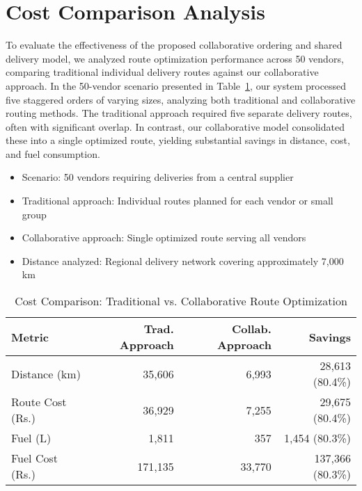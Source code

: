 \section{Cost Comparison Analysis}
To evaluate the effectiveness of the proposed collaborative ordering and shared delivery model, we analyzed route optimization performance across 50 vendors, comparing traditional individual delivery routes against our collaborative approach. In the 50-vendor scenario presented in Table~\ref{tab:cost-comparison}, our system processed five staggered orders of varying sizes, analyzing both traditional and collaborative routing methods. The traditional approach required five separate delivery routes, often with significant overlap. In contrast, our collaborative model consolidated these into a single optimized route, yielding substantial savings in distance, cost, and fuel consumption.
\begin{itemize}
    \item {Scenario:} 50 vendors requiring deliveries from a central supplier
    \item {Traditional approach:} Individual routes planned for each vendor or small group
    \item {Collaborative approach:} Single optimized route serving all vendors
    \item {Distance analyzed:} Regional delivery network covering approximately 7,000 km
\end{itemize}

\begin{table}[htbp]
    \centering
    \caption{Cost Comparison: Traditional vs. Collaborative Route Optimization}
    \label{tab:cost-comparison}
    \begin{tabular}{lrrr}
        \toprule
        \textbf{Metric}  & \textbf{Trad. Approach} & \textbf{Collab. Approach} & \textbf{Savings} \\
        \midrule
        Distance (km)    & 35,606                  & 6,993                     & 28,613 (80.4\%)  \\
        Route Cost (Rs.) & 36,929                  & 7,255                     & 29,675 (80.4\%)  \\
        Fuel (L)         & 1,811                   & 357                       & 1,454 (80.3\%)   \\
        Fuel Cost (Rs.)  & 171,135                 & 33,770                    & 137,366 (80.3\%) \\
        \bottomrule
    \end{tabular}
\end{table}


